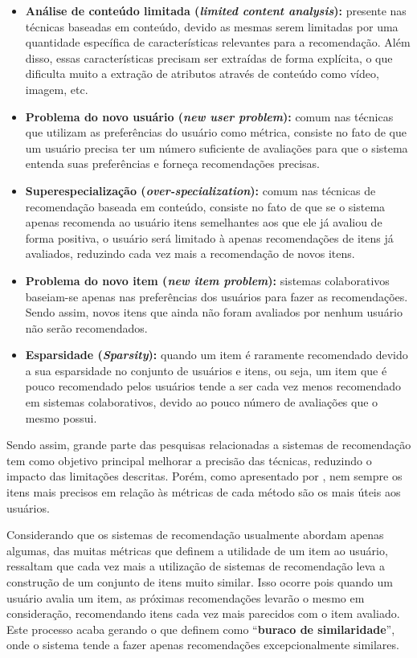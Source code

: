 \begin{itemize}
	\item \textbf{Análise de conteúdo limitada (\textit{limited content analysis}):} presente nas técnicas baseadas em conteúdo, devido as mesmas serem limitadas por uma quantidade específica de características relevantes para a recomendação. Além disso, essas características precisam ser extraídas de forma explícita, o que dificulta muito a extração de atributos através de conteúdo como vídeo, imagem, etc.

	\item \textbf{Problema do novo usuário (\textit{new user problem}):} comum nas técnicas que utilizam as preferências do usuário como métrica, consiste no fato de que um usuário precisa ter um número suficiente de avaliações para que o sistema entenda suas preferências e forneça recomendações precisas.

	\item \textbf{Superespecialização (\textit{over-specialization}):} comum nas técnicas de recomendação baseada em conteúdo, consiste no fato de que se o sistema apenas recomenda ao usuário itens semelhantes aos que ele já avaliou de forma positiva, o usuário será limitado à apenas recomendações de itens já avaliados, reduzindo cada vez mais a recomendação de novos itens.

	\item \textbf{Problema do novo item (\textit{new item problem}):} sistemas colaborativos baseiam-se apenas nas preferências dos usuários para fazer as recomendações. Sendo assim, novos itens que ainda não foram avaliados por nenhum usuário não serão recomendados.

	\item \textbf{Esparsidade (\textit{Sparsity}):} quando um item é raramente recomendado devido a sua esparsidade no conjunto de usuários e itens, ou seja, um item que é pouco recomendado pelos usuários tende a ser cada vez menos recomendado em sistemas colaborativos, devido ao pouco número de avaliações que o mesmo possui.
\end{itemize}

Sendo assim, grande parte das pesquisas relacionadas a sistemas de recomendação tem como objetivo principal melhorar a precisão das técnicas, reduzindo o impacto das limitações descritas. Porém, como apresentado por , nem sempre os itens mais precisos em relação às métricas de cada método são os mais úteis aos usuários.

Considerando que os sistemas de recomendação usualmente abordam apenas algumas, das muitas métricas que definem a utilidade de um item ao usuário,  ressaltam que cada vez mais a utilização de sistemas de recomendação leva a construção de um conjunto de itens muito similar. Isso ocorre pois quando um usuário avalia um item, as próximas recomendações levarão o mesmo em consideração, recomendando itens cada vez mais parecidos com o item avaliado. Este processo acaba gerando o que  definem como “\textbf{buraco de similaridade}”, onde o sistema tende a fazer apenas recomendações excepcionalmente similares.

